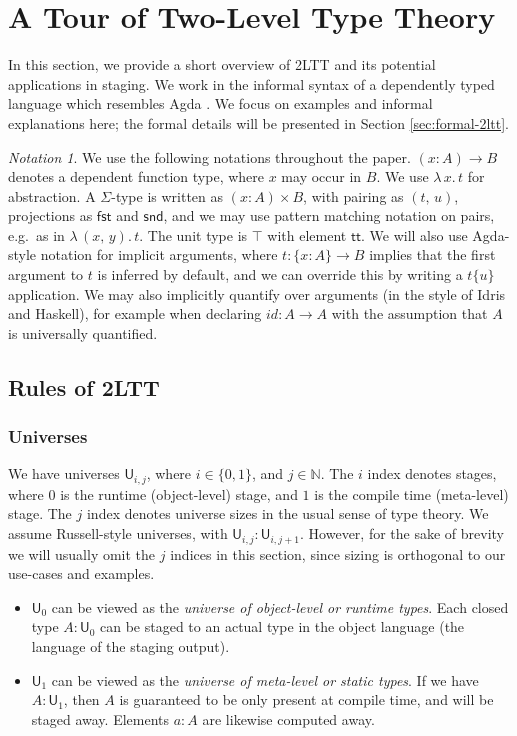 \documentclass[acmsmall]{acmart}
\newcommand{\mit}[1]{\mathit{#1}}
\newcommand{\msf}[1]{\mathsf{#1}}
\newcommand{\mbb}[1]{\mathbb{#1}}
\renewcommand{\U}{\msf{U}}
\renewcommand{\tt}{\msf{tt}}
\newcommand{\fst}{\msf{fst}}
\newcommand{\snd}{\msf{snd}}
\theoremstyle{remark}
\newtheorem{notation}{Notation}
\begin{document}
\section{A Tour of Two-Level Type Theory}\label{sec:tour-of-2ltt}

In this section, we provide a short overview of 2LTT and its potential
applications in staging. We work in the informal syntax of a dependently typed
language which resembles Agda \cite{agdadocs}. We focus on examples and informal
explanations here; the formal details will be presented in Section \ref{sec:formal-2ltt}.

\begin{notation}\label{basic-notation}
We use the following notations throughout the paper. $(x : A) \to B$ denotes a
dependent function type, where $x$ may occur in $B$. We use $\lambda\,x.\,t$ for
abstraction. A $\Sigma$-type is written as $(x : A) \times B$, with pairing as
$(t,\,u)$, projections as $\fst$ and $\snd$, and we may use pattern matching
notation on pairs, e.g.\ as in $\lambda\,(x,\,y).\,t$. The unit type is $\top$
with element $\tt$. We will also use Agda-style notation for implicit arguments,
where $t : \{x : A\} \to B$ implies that the first argument to $t$ is inferred
by default, and we can override this by writing a $t \{u\}$ application. We may
also implicitly quantify over arguments (in the style of Idris and Haskell), for
example when declaring $\mit{id} : A \to A$ with the assumption that $A$ is
universally quantified.
\end{notation}

\subsection{Rules of 2LTT}

\subsubsection{Universes}
We have universes $\U_{i,j}$, where $i \in \{0,1\}$, and $j \in \mbb{N}$.  The
$i$ index denotes stages, where $0$ is the runtime (object-level) stage, and $1$
is the compile time (meta-level) stage. The $j$ index denotes universe sizes in
the usual sense of type theory. We assume Russell-style universes, with
$\U_{i,j} : \U_{i, j+1}$. However, for the sake of brevity we will usually omit
the $j$ indices in this section, since sizing is orthogonal to our use-cases and
examples.
\begin{itemize}
\item $\U_0$ can be viewed as the \emph{universe of object-level or runtime types}.
    Each closed type $A : \U_0$ can be staged to an actual type in the object language
    (the language of the staging output).
  \item $\U_1$ can be viewed as the \emph{universe of meta-level or static types}. If we
    have $A : \U_1$, then $A$ is guaranteed to be only present at compile time,
    and will be staged away. Elements $a : A$ are likewise computed away.
\end{itemize}
\end{document}
